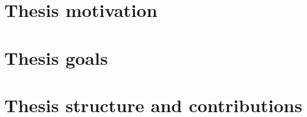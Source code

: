 \section{Thesis motivation}


\section{Thesis goals}
\label{sec:goals}


\section{Thesis structure and contributions}
\label{sec:contributions}



